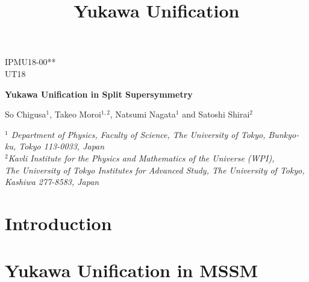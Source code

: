 \documentclass[12pt]{article}
\title{Yukawa Unification}
\newcommand{\1}{\mbox{1}\hspace{-0.25em}\mbox{l}}
\begin{document}
\baselineskip 0.6cm

\def\simgt{\mathrel{\lower2.5pt\vbox{\lineskip=0pt\baselineskip=0pt
           \hbox{$>$}\hbox{$\sim$}}}}
\def\simlt{\mathrel{\lower2.5pt\vbox{\lineskip=0pt\baselineskip=0pt
           \hbox{$<$}\hbox{$\sim$}}}}
\def\simprop{\mathrel{\lower3.0pt\vbox{\lineskip=1.0pt\baselineskip=0pt
             \hbox{$\propto$}\hbox{$\sim$}}}}
\def\tr{\mathop{\rm tr}}
\def\SU{\mathop{\rm SU}}

\begin{titlepage}

\begin{flushright}
IPMU18-00** \\
UT18
\end{flushright}

\vskip 1.1cm

\begin{center}

{\Large \bf 
Yukawa Unification in Split Supersymmetry
}

\vskip 1.2cm
So Chigusa$^1$,
Takeo Moroi$^{1,2}$,
Natsumi Nagata$^1$ and 
Satoshi Shirai$^2$
\vskip 0.5cm

{\it
{
$^1$
Department of Physics, Faculty of Science,
The University of Tokyo, Bunkyo-ku, Tokyo 113-0033, Japan
}\\
{$^2$Kavli Institute for the Physics and Mathematics of the Universe (WPI), \\The University of Tokyo Institutes for Advanced Study, The University of Tokyo, Kashiwa
 277-8583, Japan}
}


\vskip 1.0cm


\end{center}
\end{titlepage}

\section{Introduction}
\label{sec:intro}

\section{Yukawa Unification in MSSM}
\label{sec:Yukawa_MSSM}
\end{document}
